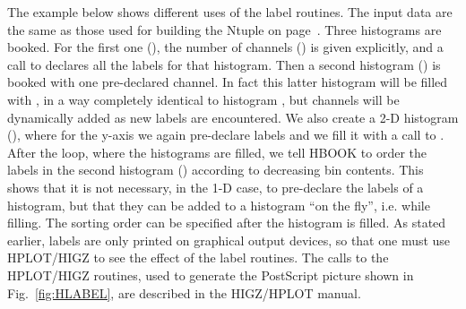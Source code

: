 The example below shows different uses of the label routines.
The input data are the same as those used for building the Ntuple
on page~\pageref{sec:ntuplestaff}.
Three histograms are booked. For the first one (), the number
of channels () is given explicitly, and a call to 
declares all the labels for that histogram.
Then a second histogram () is booked with one pre-declared channel.
In fact this latter histogram will be filled with , in a way
completely identical to histogram , 
but channels will be dynamically added as new labels are encountered.
We also create a 2-D histogram (), where for the y-axis we
again pre-declare labels and we fill it with a call to .
After the loop, where the histograms are filled, we tell HBOOK to
order the labels in the second histogram () according to
decreasing bin contents.
This shows that it is not necessary, in the 1-D case, to
pre-declare the labels of a histogram, but that they can be
added to a histogram ``on the fly'', i.e. while filling.
The sorting order can be specified after the histogram is filled.
As stated earlier, labels are only printed on graphical output devices,
so that one must use HPLOT/HIGZ to see the effect of the label routines.
The calls to the HPLOT/HIGZ routines, used to generate the PostScript
picture shown in Fig.~\ref{fig:HLABEL}, are described in the HIGZ/HPLOT
manual.

\finalnewpage%

